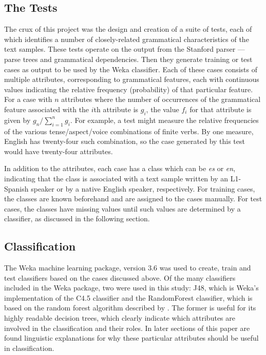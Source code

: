 \documentclass[main.tex]{subfiles}
\begin{document}
\subsection{The Tests}
The crux of this project was the design and creation of a suite of tests, each of which identifies a number of closely-related grammatical characteristics of the text samples. These tests operate on the output from the Stanford parser --- parse trees and grammatical dependencies. Then they generate training or test cases as output to be used by the Weka classifier. Each of these cases consists of multiple attributes, corresponding to grammatical features, each with continuous values indicating the relative frequency (probability) of that particular feature. For a case with $n$ attributes where the number of occurrences of the grammatical feature associated with the $i$th attribute is $g_i$, the value $f_i$ for that attribute is given by $g_n  / \displaystyle\sum\limits_{i=1}^n g_i$. For example, a test might measure the relative frequencies of the various tense/aspect/voice combinations of finite verbs. By one measure, English has twenty-four such combination, so the case generated by this test would have twenty-four attributes.

In addition to the attributes, each case has a class which can be \textit{es} or \textit{en}, indicating that the class is associated with a text sample written by an L1-Spanish speaker or by a native English speaker, respectively. For training cases, the classes are known beforehand and are assigned to the cases manually. For test cases, the classes have missing values until such values are determined by a classifier, as discussed in the following section.

\subsection{Classification}

The Weka machine learning package, version 3.6 \citep{hall-et-al:2009} was used to create, train and test classifiers based on the cases discussed above. Of the many classifiers included in the Weka package, two were used in this study: J48, which is Weka's implementation of the C4.5 classifier \citep{quinlan:1993} and the RandomForest classifier, which is based on the random forest algorithm described by \citet{breiman:2001}. The former is useful for its highly readable decision trees, which clearly indicate which attributes are involved in the classification and their roles. In later sections of this paper are found linguistic explanations for why these particular attributes should be useful in classification.
 
\end{document}
